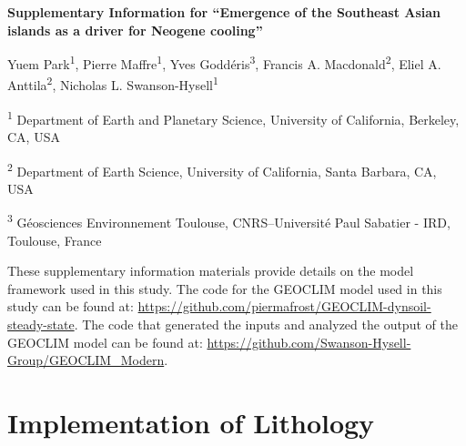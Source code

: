 \documentclass[11pt,letterpaper]{article}
\begin{document}
\begin{flushleft}
{\Large \textbf{Supplementary Information for ``Emergence of the Southeast Asian islands as a driver for Neogene cooling''}}

Yuem Park\textsuperscript{1},
Pierre Maffre\textsuperscript{1},
Yves Godd\'eris\textsuperscript{3},
Francis A. Macdonald\textsuperscript{2},
Eliel A. Anttila\textsuperscript{2},
Nicholas L. Swanson-Hysell\textsuperscript{1}

\bigskip
\textsuperscript{1} Department of Earth and Planetary Science, University of California, Berkeley, CA, USA

\textsuperscript{2} Department of Earth Science, University of California, Santa Barbara, CA, USA

\textsuperscript{3} G\'eosciences Environnement Toulouse, CNRS--Universit\'e Paul Sabatier - IRD, Toulouse, France

\bigskip

\end{flushleft}

\linenumbers

These supplementary information materials provide details on the model framework used in this study. The code for the GEOCLIM model used in this study can be found at: \url{https://github.com/piermafrost/GEOCLIM-dynsoil-steady-state}. The code that generated the inputs and analyzed the output of the GEOCLIM model can be found at: \url{https://github.com/Swanson-Hysell-Group/GEOCLIM_Modern}.

\section*{Implementation of Lithology}
\end{document}
